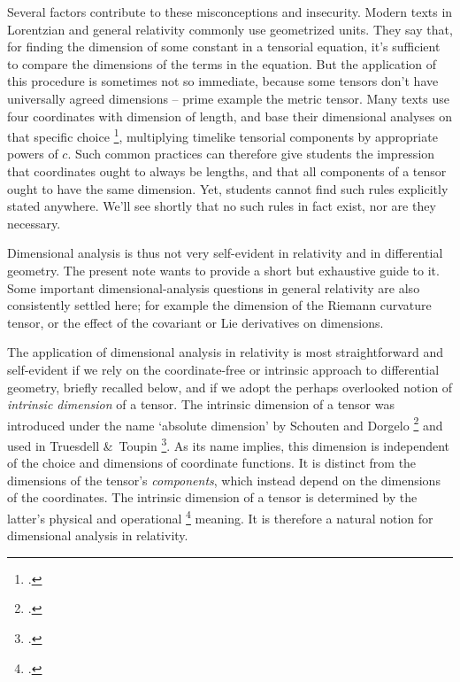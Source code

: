 \documentclass[\ifafour a4paper,12pt,\else a5paper,10pt,\fi%
onecolumn,oneside,article,%
british%
]{memoir}
\newcommand*{\defquote}[1]{`#1'}
\theoremstyle{remark}
\theoremstyle{innote}
\newcommand*{\citep}{\footcites}
\newcommand*{\amp}{\&}
\renewcommand*{\|}[1][]{\nonscript\,#1\vert\nonscript\;\mathopen{}}
\newcommand*{\sect}{\S}%
\newcommand*{\chap}{ch.}%
\newcommand*{\eqn}{eq.}%
\newcommand*{\eg}{{e.g.}}
\begin{document}
Several factors contribute to these misconceptions and insecurity. Modern
texts in Lorentzian and general relativity commonly use geometrized units.
They say that, for finding the dimension of some constant in a tensorial
equation, it's sufficient to compare the dimensions of the terms in the
equation. But the application of this procedure is sometimes not so
immediate, because some tensors don't have universally agreed dimensions --
prime example the metric tensor. Many texts use four coordinates with
dimension of length, and base their dimensional analyses on that specific
choice \citep[\eg][p.~71 \eqn~(37.1)]{tolman1934_t1949}[p.~80
\eqn~(32.15)]{landauetal1939_t1996}[for exceptions with coordinates with mixed dimensions see \eg][\sect~V.55]{fock1955_t1964}[\sect~4.1]{mcvittie1956_r1965}[\sect~VII.1]{fokker1960_t1965}[\sect~F.III.280]{truesdelletal1960}[\sect~X]{kitano2013},%
multiplying timelike tensorial components by appropriate powers of $c$.
Such common practices can therefore give students the impression that
coordinates ought to always be lengths, and that all components of a tensor
ought to have the same dimension. Yet, students cannot find such rules
explicitly stated anywhere. We'll see shortly that no such rules in fact
exist, nor are they necessary.

\medskip

Dimensional analysis is thus not very self-evident in relativity and in
differential geometry. The present note wants to provide a short but
exhaustive guide to it.
Some important dimensional-analysis questions in general relativity are
also consistently settled here; for example the dimension of the Riemann
curvature tensor, or the effect of the covariant or Lie derivatives on
dimensions.

The application of dimensional analysis in relativity is most
straightforward and self-evident if we rely on the coordinate-free or
intrinsic approach to differential geometry, briefly recalled below, and if
we adopt the perhaps overlooked notion of \emph{intrinsic dimension} of a
tensor. %
The intrinsic dimension of a tensor was
introduced under the name \defquote{absolute dimension} by Schouten and
Dorgelo \citep{dorgeloetal1946}[\chap~VI]{schouten1951_r1989} and used in
Truesdell \amp\ Toupin \citep[Appendix II]{truesdelletal1960}. As its name
implies, this dimension is independent of the choice and dimensions of
coordinate functions. It is distinct from the dimensions of the tensor's
\emph{components}, which instead depend on the dimensions of the
coordinates. The intrinsic dimension of a tensor is determined by the
latter's physical and operational \citep{bridgman1927_r1958} meaning. It is
therefore a natural notion for dimensional analysis in relativity.
\end{document}
